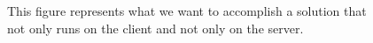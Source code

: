 
\begin{figure}[H]
\centering
{}
    \caption{This figure represents what we want to accomplish a solution that not only runs on the client and not only on the server.}
    \label{fig:shared}
\end{figure}
